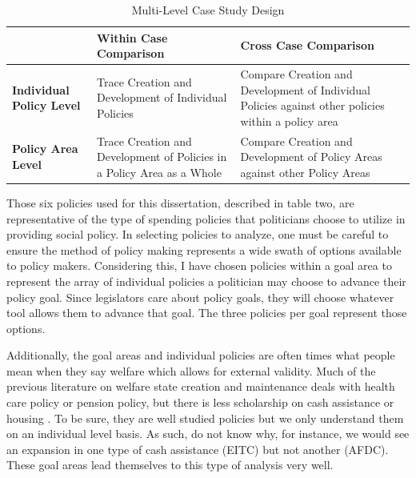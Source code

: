 \documentclass[12pt]{article}
\begin{document}

\begin{table}
\centering
    \begin{tabularx}{\textwidth}{XXX} \toprule
           & \textbf{Within Case Comparison} & \textbf{Cross Case Comparison                                                                              } \\ \midrule
    \textbf{Individual Policy Level} & Trace Creation and Development of Individual Policies        & Compare Creation and Development of Individual Policies against other policies within a policy area \\
    \textbf{Policy Area Level}       & Trace Creation and Development of Policies in a Policy Area as a Whole & Compare Creation and Development of Policy Areas against other Policy Areas                         \\ \bottomrule
    \end{tabularx}
  \caption{Multi-Level Case Study Design}
  \label{tab:casestudy}
\end{table}

Those six policies used for this dissertation, described in table two, are representative of the type of spending policies that politicians choose to utilize in providing social policy. In selecting policies to analyze, one must be careful to ensure the method of policy making represents a wide swath of options available to policy makers. Considering this, I have chosen policies within a goal area to represent the array of individual policies a politician may choose to advance their policy goal. Since legislators care about policy goals, they will choose whatever tool allows them to advance that goal. The three policies per goal represent those options. 

Additionally, the goal areas and individual policies are often times what people mean when they say welfare which allows for external validity. Much of the previous literature on welfare state creation and maintenance deals with health care policy or pension policy, but there is less scholarship on cash assistance or housing \citep{derthick1979, hacker2002, campbell2005}. To be sure, they are well studied policies but we only understand them on an individual level basis. As such, do not know why, for instance, we would see an expansion in one type of cash assistance (EITC) but not another (AFDC). These goal areas lead themselves to this type of analysis very well.
\end{document}
